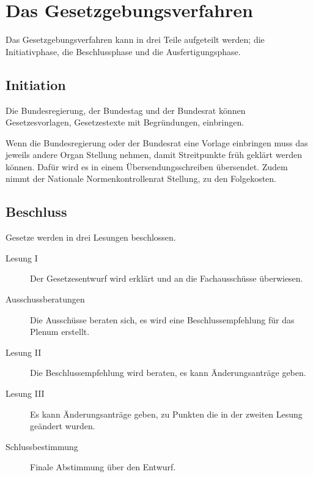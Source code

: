 \documentclass{article}
\begin{document}
\section{Das Gesetzgebungsverfahren} 
Das Gesetzgebungsverfahren kann in drei Teile aufgeteilt werden; die Initiativphase, die Beschlussphase und die Ausfertigungsphase.

\subsection{Initiation}
Die Bundesregierung, der Bundestag und der Bundesrat können Gesetzesvorlagen, Gesetzestexte mit Begründungen, einbringen.

Wenn die Bundesregierung oder der Bundesrat eine Vorlage einbringen muss das jeweils andere Organ Stellung nehmen, damit Streitpunkte früh geklärt werden können. Dafür wird es in einem Übersendungsschreiben übersendet. Zudem nimmt der Nationale Normenkontrollenrat Stellung, zu den Folgekosten.

\subsection{Beschluss}
Gesetze werden in drei Lesungen beschlossen.
\begin{description}
 \item[Lesung I] Der Gesetzesentwurf wird erklärt und an die Fachausschüsse überwiesen.
 \item[Ausschussberatungen] Die Ausschüsse beraten sich, es wird eine Beschlussempfehlung für das Plenum erstellt.
 \item[Lesung II] Die Beschlussempfehlung wird beraten, es kann Änderungsanträge geben.
 \item[Lesung III] Es kann Änderungsanträge geben, zu Punkten die in der zweiten Lesung geändert wurden. 
 \item[Schlussbestimmung] Finale Abstimmung über den Entwurf.
\end{description}
\end{document}
